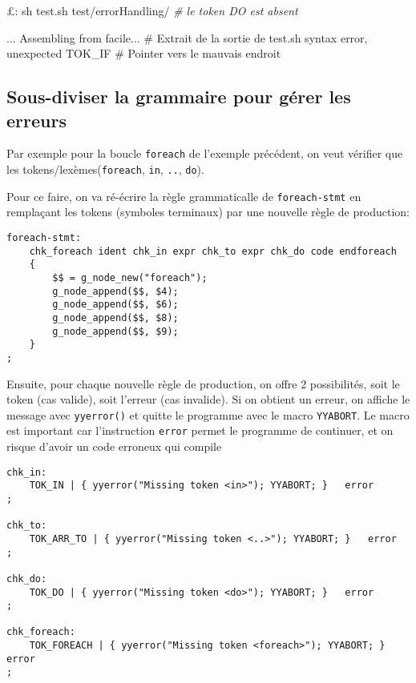 \documentclass[11pt]{article}
\newenvironment{Shaded}{}{}
\newcommand{\CommentTok}[1]{\textcolor[rgb]{0.38,0.63,0.69}{\textit{{#1}}}}
\newcommand{\FunctionTok}[1]{\textcolor[rgb]{0.02,0.16,0.49}{{#1}}}
\newcommand{\NormalTok}[1]{{#1}}
\newcommand{\ExtensionTok}[1]{{#1}}
\begin{document}
\begin{Shaded}
\begin{Highlighting}[]
\NormalTok{£: }\FunctionTok{sh}\NormalTok{ test.sh test/errorHandling/ }\CommentTok{# le token DO est absent}

\ExtensionTok{...}
\ExtensionTok{Assembling}\NormalTok{ from facile...         # Extrait de la sortie de test.sh}
\ExtensionTok{syntax}\NormalTok{ error, unexpected TOK_IF   # Pointer vers le mauvais endroit}
\end{Highlighting}
\end{Shaded}

\hypertarget{sous-diviser-la-grammaire-pour-guxe9rer-les-erreurs}{%
\subsection{Sous-diviser la grammaire pour gérer les
erreurs}\label{sous-diviser-la-grammaire-pour-guxe9rer-les-erreurs}}

Par exemple pour la boucle \texttt{foreach} de l'exemple précédent, on
veut vérifier que les tokens/lexèmes(\texttt{foreach}, \texttt{in},
\texttt{..}, \texttt{do}).

Pour ce faire, on va ré-écrire la règle grammaticalle de
\texttt{foreach-stmt} en remplaçant les tokens (symboles terminaux) par
une nouvelle règle de production:

\begin{verbatim}
foreach-stmt:
    chk_foreach ident chk_in expr chk_to expr chk_do code endforeach
    {
        $$ = g_node_new("foreach");
        g_node_append($$, $4);
        g_node_append($$, $6);
        g_node_append($$, $8);
        g_node_append($$, $9);
    }
;
\end{verbatim}

Ensuite, pour chaque nouvelle règle de production, on offre 2
possibilités, soit le token (cas valide), soit l'erreur (cas invalide).
Si on obtient un erreur, on affiche le message avec \texttt{yyerror()}
et quitte le programme avec le macro \texttt{YYABORT}. Le macro est
important car l'instruction \texttt{error} permet le programme de
continuer, et on risque d'avoir un code erroneux qui compile

\begin{verbatim}
chk_in:
    TOK_IN | { yyerror("Missing token <in>"); YYABORT; }   error
;

chk_to:
    TOK_ARR_TO | { yyerror("Missing token <..>"); YYABORT; }   error
;

chk_do:
    TOK_DO | { yyerror("Missing token <do>"); YYABORT; }   error
;

chk_foreach:
    TOK_FOREACH | { yyerror("Missing token <foreach>"); YYABORT; }   error
;
\end{verbatim}
\end{document}
